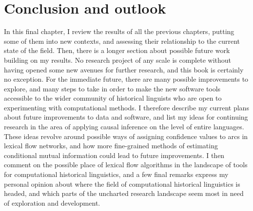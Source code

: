 \chapter{Conclusion and outlook}
In this final chapter, I review the results of all the previous chapters, putting some of them into new contexts, and assessing their relationship to the current state of the field. Then, there is a longer section about possible future work building on my results. No research project of any scale is complete without having opened some new avenues for further research, and this book is certainly no exception. For the immediate future, there are many possible improvements to explore, and many steps to take in order to make the new software tools accessible to the wider community of historical linguists who are open to experimenting with computational methods. I therefore describe my current plans about future improvements to data and software, and list my ideas for continuing research in the area of applying causal inference on the level of entire languages. These ideas revolve around possible ways of assigning confidence values to arcs in lexical flow networks, and how more fine-grained methods of estimating conditional mutual information could lead to future improvements. I then comment on the possible place of lexical flow algorithms in the landscape of tools for computational historical linguistics, and a few final remarks express my personal opinion about where the field of computational historical linguistics is headed, and which parts of the uncharted research landscape seem most in need of exploration and development.

